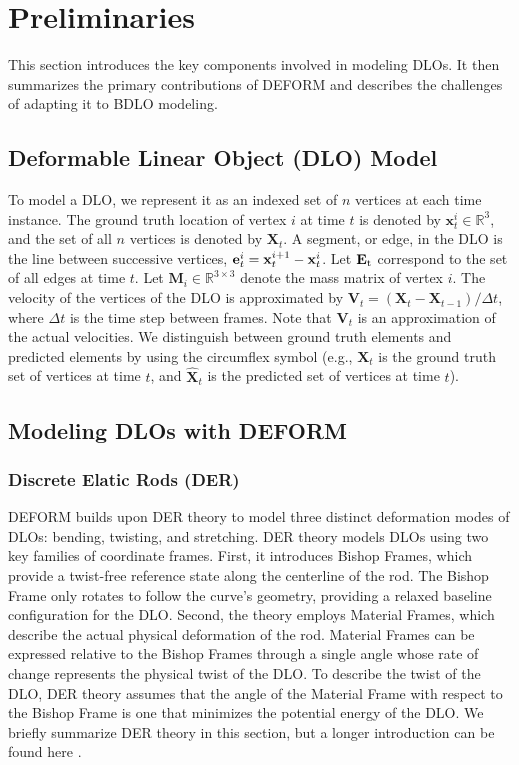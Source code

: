 \section{Preliminaries}
This section introduces the key components involved in modeling DLOs. 
It then summarizes the primary contributions of DEFORM and describes the challenges of adapting it to BDLO modeling.

\subsection{Deformable Linear Object (DLO) Model}
To model a DLO, we represent it as an indexed set of $n$ vertices at each time instance. 
The ground truth location of vertex $i$ at time $t$ is denoted by $\mathbf{x}_t^i \in \mathbb{R}^3$, and the set of all $n$ vertices is denoted by $\mathbf{X}_t$.
A segment, or edge, in the DLO is the line between successive vertices, $\mathbf{e}^{i}_{t} = \mathbf{x}^{i+1}_{t} - \mathbf{x}^{i}_{t}$.
Let $\mathbf{E}_\text{t}$ correspond to the set of all edges at time $t$.
Let $\mathbf{M}_i \in \mathbb{R}^{3 \times 3}$ denote the mass matrix of vertex $i$.
The velocity of the vertices of the DLO is approximated by $\mathbf{V}_t = (\mathbf{X}_t - \mathbf{X}_{t-1})/{\Delta t}$, where $\Delta t$ is the time step between frames.
Note that $\mathbf{V}_t$ is an approximation of the actual velocities.
We distinguish between ground truth elements and predicted elements by using the circumflex symbol (e.g., $\mathbf{X}_t$ is the ground truth set of vertices at time $t$, and $\hat{\mathbf{X}}_t$ is the predicted set of vertices at time $t$).

\subsection{Modeling DLOs with DEFORM}
\subsubsection{Discrete Elatic Rods (DER)}
DEFORM builds upon DER theory to model three distinct deformation modes of DLOs: bending, twisting, and stretching. 
DER theory models DLOs using two key families of coordinate frames.
First, it introduces Bishop Frames, which provide a twist-free reference state along the centerline of the rod. 
The Bishop Frame only rotates to follow the curve's geometry, providing a relaxed baseline configuration for the DLO. 
Second, the theory employs Material Frames, which describe the actual physical deformation of the rod.
Material Frames can be expressed relative to the Bishop Frames through a single angle whose rate of change represents the physical twist of the DLO. 
To describe the twist of the DLO, DER theory assumes that the angle of the Material Frame with respect to the Bishop Frame is one that minimizes the potential energy of the DLO.
We briefly summarize DER theory in this section, but a longer introduction can be found here \cite{bishopframe}.

